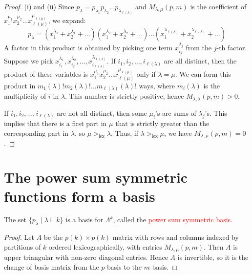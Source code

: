 \documentclass[12pt]{memoir}
\begin{document}
\begin{proof}
(i) and (ii) Since $p_\lambda = p_{\lambda_1} p_{\lambda_2} \dots p_{\lambda_{\ell(\lambda)}}$ and $M_{\lambda,\mu}(p,m)$ is the coefficient of $x_1^{\mu_1} x_2^{\mu_2} \dots x_{\ell(\mu)}^{\mu_{\ell(\mu)}}$, we expand:
\[
p_\lambda = (x_1^{\lambda_1} + x_2^{\lambda_1} + \dots)(x_1^{\lambda_2} + x_2^{\lambda_2} + \dots) \dots (x_1^{\lambda_{\ell(\lambda)}} + x_2^{\lambda_{\ell(\lambda)}} + \dots)
\]
A factor in this product is obtained by picking one term $x_{i_j}^{\lambda_j}$ from the $j$-th factor. Suppose we pick $x_{i_1}^{\lambda_1}, x_{i_2}^{\lambda_2}, \dots, x_{i_{\ell(\lambda)}}^{\lambda_{\ell(\lambda)}}$. If $i_1, i_2, \dots, i_{\ell(\lambda)}$ are all distinct, then the product of these variables is $x_1^{\mu_1} x_2^{\mu_2} \dots x_{\ell(\mu)}^{\mu_{\ell(\mu)}}$ only if $\lambda = \mu$. We can form this product in $m_1(\lambda)! m_2(\lambda)! \dots m_{\ell(\lambda)}(\lambda)!$ ways, where $m_i(\lambda)$ is the multiplicity of $i$ in $\lambda$. This number is strictly positive, hence $M_{\lambda,\lambda}(p,m) > 0$.

If $i_1, i_2, \dots, i_{\ell(\lambda)}$ are not all distinct, then some $\mu_i$'s are sums of $\lambda_j$'s. This implies that there is a first part in $\mu$ that is strictly greater than the corresponding part in $\lambda$, so $\mu >_{\text{lex}} \lambda$. Thus, if $\lambda >_{\text{lex}} \mu$, we have $M_{\lambda,\mu}(p,m) = 0$.
\end{proof}

\newpage

\section{The power sum symmetric functions form a basis}

\begin{ptcb}
\begin{Prop}
The set $\{p_\lambda \mid \lambda \vdash k\}$ is a basis for $\Lambda^k$, called the \textcolor{red}{power sum symmetric basis}.
\end{Prop}
\end{ptcb}

\begin{proof}
Let $A$ be the $p(k) \times p(k)$ matrix with rows and columns indexed by partitions of $k$ ordered lexicographically, with entries $M_{\lambda,\mu}(p,m)$. Then $A$ is upper triangular with non-zero diagonal entries. Hence $A$ is invertible, so it is the change of basis matrix from the $p$ basis to the $m$ basis.
\end{proof}
\end{document}
